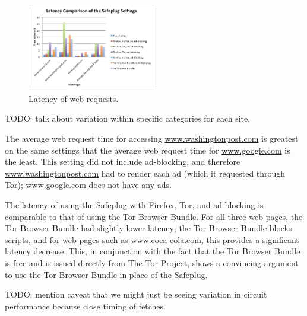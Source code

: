 \documentclass[letterpaper,twocolumn,10pt]{article}
\begin{document}
\begin{figure}
  \centering
  \includegraphics[width=0.5\textwidth]{latencygraph}
  \caption{Latency of web requests.}
  \label{fig:latency2}
\end{figure}

TODO: talk about variation within specific categories for each site.

The average web request time for accessing \url{www.washingtonpost.com} is greatest on the same settings that the average web request time for \url{www.google.com} is the least. This setting did not include ad-blocking, and therefore \url{www.washingtonpost.com} had to render each ad (which it requested through Tor); \url{www.google.com} does not have any ads.

The latency of using the Safeplug with Firefox, Tor, and ad-blocking is comparable to that of using the Tor Browser Bundle.  For all three web pages, the Tor Browser Bundle had slightly lower latency; the Tor Browser Bundle blocks scripts, and for web pages such as \url{www.coca-cola.com}, this provides a significant latency decrease.  This, in conjunction with the fact that the Tor Browser Bundle is free and is issued directly from The Tor Project, shows a convincing argument to use the Tor Browser Bundle in place of the Safeplug.  

TODO: mention caveat that we might just be seeing variation in circuit performance because close timing of fetches.  
\end{document}
